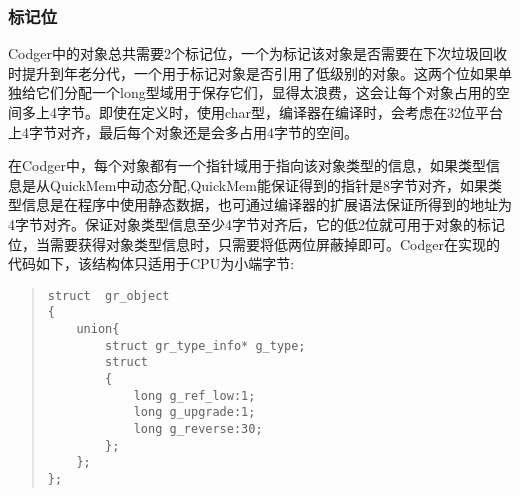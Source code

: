 \subsubsection{标记位}
Codger中的对象总共需要2个标记位，一个为标记该对象是否需要在下次垃圾回收时提升到年老分代，一个用于标记对象是否引用了低级别的对象。这两个位如果单独给它们分配一个long型域用于保存它们，显得太浪费，这会让每个对象占用的空间多上4字节。即使在定义时，使用char型，编译器在编译时，会考虑在32位平台上4字节对齐，最后每个对象还是会多占用4字节的空间。

在Codger中，每个对象都有一个指针域用于指向该对象类型的信息，如果类型信息是从QuickMem中动态分配,QuickMem能保证得到的指针是8字节对齐，如果类型信息是在程序中使用静态数据，也可通过编译器的扩展语法保证所得到的地址为4字节对齐。保证对象类型信息至少4字节对齐后，它的低2位就可用于对象的标记位，当需要获得对象类型信息时，只需要将低两位屏蔽掉即可。Codger在实现的代码如下，该结构体只适用于CPU为小端字节:
\begin{quote}
\begin{verbatim} 
struct  gr_object 
{
    union{
        struct gr_type_info* g_type;
        struct 
        {
            long g_ref_low:1;  
            long g_upgrade:1;
            long g_reverse:30;
        };
    };
};
\end{verbatim}
\end{quote}

















